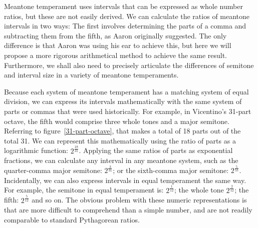 Meantone temperament uses intervals that can be expressed as whole number ratios,
but these are not easily derived.  We can calculate the ratios of meantone intervals in
two ways: The first involves determining the parts of a comma and subtracting them
from the fifth, as Aaron originally suggested.  The only difference is that Aaron
was using his ear to achieve this, but here we will propose a more rigorous arithmetical
method to achieve the same result.  Furthermore, we shall also need to
precisely articulate the differences of semitone and interval size in a variety of
meantone temperaments.

Because each system of meantone temperament has a matching system of equal
division, we can express its intervals mathematically with the same system of parts or
commas that were used historically.  For example, in Vicentino's 31-part octave, the fifth
would comprise three whole tones and a major semitone. Referring to
figure~\ref{31-part-octave}, that makes a total of 18 parts out of the total 31.  We
can represent this mathematically using the ratio of parts as a logarithmic function:
$2^\frac{18}{31}$.  Applying the same ratios of parts as exponential fractions, we can
calculate any interval in any meantone system, such as the quarter-comma major
semitone: $ 2^\frac{3}{31} $; or the sixth-comma major semitone: $ 2^\frac{5}{55} $.
Incidentally, we can also express intervals in equal temperament the same way.  For
example, the semitone in equal temperament is: $ 2^\frac{1}{12} $; the whole tone $
2^\frac{2}{12} $; the fifth: $ 2^\frac{5}{12} $ and so on.  The obvious problem with these numeric
representations is that are more difficult to comprehend than a simple number, and are
not readily comparable to standard Pythagorean ratios.


